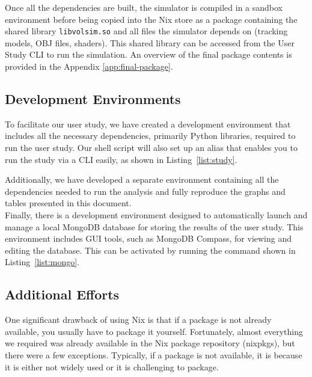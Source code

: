 Once all the dependencies are built, the simulator is compiled in a sandbox environment before being copied into the Nix store as a package containing the shared library \texttt{libvolsim.so} and all files the simulator depends on (tracking models, OBJ files, shaders). This shared library can be accessed from the User Study CLI to run the simulation. An overview of the final package contents is provided in the Appendix \ref{app:final-package}.

\subsection{Development Environments}

To facilitate our user study, we have created a development environment that includes all the necessary dependencies, primarily Python libraries, required to run the user study. Our shell script will also set up an alias that enables you to run the study via a CLI easily, as shown in Listing~\ref{list:study}.


Additionally, we have developed a separate environment containing all the dependencies needed to run the analysis and fully reproduce the graphs and tables presented in this document. \\

Finally, there is a development environment designed to automatically launch and manage a local MongoDB database for storing the results of the user study. This environment includes GUI tools, such as MongoDB Compass, for viewing and editing the database. This can be activated by running the command shown in Listing~\ref{list:mongo}.


\subsection{Additional Efforts}

One significant drawback of using Nix is that if a package is not already available, you usually have to package it yourself. Fortunately, almost everything we required was already available in the Nix package repository (nixpkgs), but there were a few exceptions. Typically, if a package is not available, it is because it is either not widely used or it is challenging to package.


